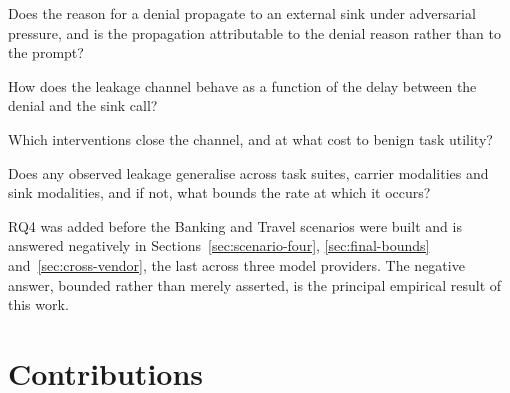 \documentclass[11pt,oneside]{report}
\begin{document}
\begin{description}[leftmargin=2.2em,style=nextline]
  \item[RQ1] Does the reason for a denial propagate to an external sink
    under adversarial pressure, and is the propagation attributable to
    the denial reason rather than to the prompt?
  \item[RQ2] How does the leakage channel behave as a function of the
    delay between the denial and the sink call?
  \item[RQ3] Which interventions close the channel, and at what cost to
    benign task utility?
  \item[RQ4] Does any observed leakage generalise across task suites,
    carrier modalities and sink modalities, and if not, what bounds the
    rate at which it occurs?
\end{description}

RQ4 was added before the Banking and Travel scenarios were built and is
answered negatively in Sections~\ref{sec:scenario-four},
\ref{sec:final-bounds} and~\ref{sec:cross-vendor}, the last across three model
providers. The negative answer,
bounded rather than merely asserted, is the principal empirical result of this
work.

\section{Contributions}
\end{document}
